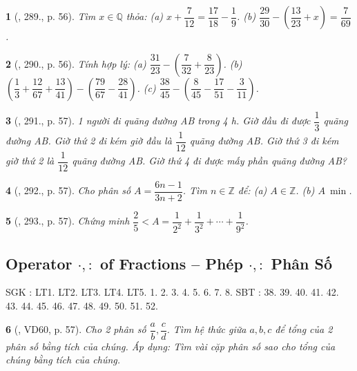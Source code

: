 \documentclass{article}
\newtheorem{baitoan}{}
\begin{document}
\begin{baitoan}[\cite{Tuyen_Toan_6}, 289., p. 56]
	Tìm $x\in\mathbb{Q}$ thỏa: (a) $x + \dfrac{7}{12} = \dfrac{17}{18} - \dfrac{1}{9}$. (b) $\dfrac{29}{30} - \left(\dfrac{13}{23} + x\right) = \dfrac{7}{69}$.
\end{baitoan}

\begin{baitoan}[\cite{Tuyen_Toan_6}, 290., p. 56]
	Tính hợp lý: (a) $\dfrac{31}{23} - \left(\dfrac{7}{32} + \dfrac{8}{23}\right)$. (b) $\left(\dfrac{1}{3} + \dfrac{12}{67} + \dfrac{13}{41}\right) - \left(\dfrac{79}{67} - \dfrac{28}{41}\right)$. (c) $\dfrac{38}{45} - \left(\dfrac{8}{45} - \dfrac{17}{51} - \dfrac{3}{11}\right)$.
\end{baitoan}

\begin{baitoan}[\cite{Tuyen_Toan_6}, 291., p. 57]
	1 người đi quãng đường AB trong {\rm4 h}. Giờ đầu đi được $\dfrac{1}{3}$ quãng đường AB. Giờ thứ 2 đi kém giờ đầu là $\dfrac{1}{12}$ quãng đường AB. Giờ thứ 3 đi kém giờ thứ 2 là $\dfrac{1}{12}$ quãng đường AB. Giờ thứ 4 đi được mấy phần quãng đường AB?
\end{baitoan}

\begin{baitoan}[\cite{Tuyen_Toan_6}, 292., p. 57]
	Cho phân số $A = \dfrac{6n - 1}{3n + 2}$. Tìm $n\in\mathbb{Z}$ để: (a) $A\in\mathbb{Z}$. (b) $A\ \min$.
\end{baitoan}

\begin{baitoan}[\cite{Tuyen_Toan_6}, 293., p. 57]
	Chứng minh $\dfrac{2}{5} < A = \dfrac{1}{2^2} + \dfrac{1}{3^2} + \cdots + \dfrac{1}{9^2}$.
\end{baitoan}

\subsection{Operator $\cdot,:$ of Fractions -- Phép $\cdot,:$ Phân Số}
SGK \cite[Chap. V, \S4, pp. 40--43]{SGK_Toan_6_Canh_Dieu_tap_2}: LT1. LT2. LT3. LT4. LT5. 1. 2. 3. 4. 5. 6. 7. 8. SBT \cite[Chap. V, \S4, pp. 40--42]{SBT_Toan_6_Canh_Dieu_tap_2}: 38. 39. 40. 41. 42. 43. 44. 45. 46. 47. 48. 49. 50. 51. 52.

\begin{baitoan}[\cite{Tuyen_Toan_6}, VD60, p. 57]
	Cho 2 phân số $\dfrac{a}{b},\dfrac{c}{d}$. Tìm hệ thức giữa $a,b,c$ để tổng của 2 phân số bằng tích của chúng. Áp dụng: Tìm vài cặp phân số sao cho tổng của chúng bằng tích của chúng.
\end{baitoan}
\end{document}
